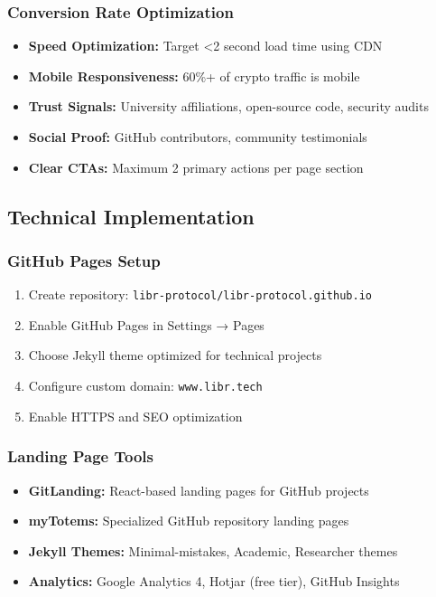 \documentclass[12pt,a4paper]{article}
\begin{document}
\subsubsection{Conversion Rate Optimization}
\begin{itemize}
    \item \textbf{Speed Optimization:} Target <2 second load time using CDN
    \item \textbf{Mobile Responsiveness:} 60\%+ of crypto traffic is mobile
    \item \textbf{Trust Signals:} University affiliations, open-source code, security audits
    \item \textbf{Social Proof:} GitHub contributors, community testimonials
    \item \textbf{Clear CTAs:} Maximum 2 primary actions per page section
\end{itemize}

\subsection{Technical Implementation}

\subsubsection{GitHub Pages Setup}
\begin{enumerate}
    \item Create repository: \texttt{libr-protocol/libr-protocol.github.io}
    \item Enable GitHub Pages in Settings → Pages
    \item Choose Jekyll theme optimized for technical projects
    \item Configure custom domain: \texttt{www.libr.tech}
    \item Enable HTTPS and SEO optimization
\end{enumerate}

\subsubsection{Landing Page Tools}
\begin{itemize}
    \item \textbf{GitLanding:} React-based landing pages for GitHub projects
    \item \textbf{myTotems:} Specialized GitHub repository landing pages
    \item \textbf{Jekyll Themes:} Minimal-mistakes, Academic, Researcher themes
    \item \textbf{Analytics:} Google Analytics 4, Hotjar (free tier), GitHub Insights
\end{itemize}
\end{document}

